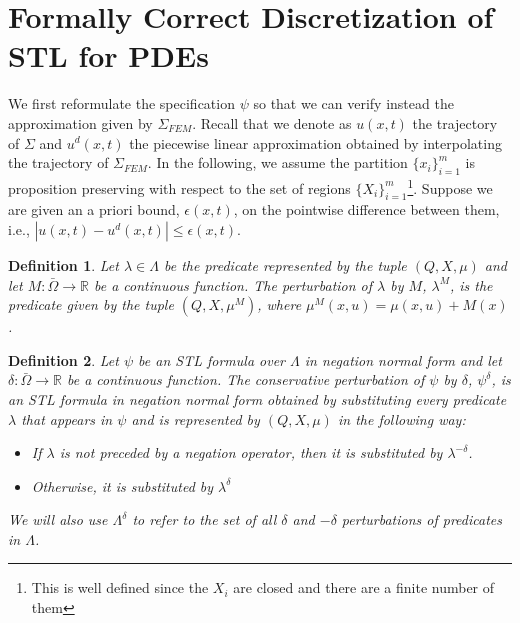 \documentclass{article}
\newtheorem{definition}{Definition}
\newcommand*{\R}{\mathbb{R}}
\begin{document}
\section{Formally Correct Discretization of STL for PDEs}
\label{sec:formally_correct_discretization_of_pdestl}

We first reformulate the specification $\psi$ so that we can verify instead the
approximation given by $\Sigma_{FEM}$. Recall that we denote as $u(x,t)$ the
trajectory of $\Sigma$ and $u^d(x, t)$ the piecewise linear approximation
obtained by interpolating the trajectory of $\Sigma_{FEM}$. In the following, we
assume the partition $\{x_i\}_{i=1}^m$ is proposition preserving with respect 
to the set of
regions $\{X_i\}_{i = 1}^{m}$\footnote{This is well defined since the $X_i$ are
closed and there are a finite number of them}. Suppose we are given
an a priori bound, $\epsilon(x, t)$, on the pointwise difference between them, i.e., 
$|u(x, t) - u^d(x, t)| \leq \epsilon(x, t)$.

\begin{definition}
\label{def:m_perturbation}
    Let $\lambda \in \Lambda$ be the predicate represented by the tuple $(Q, X,
    \mu)$ and let $M : \bar\Omega \to \R$ be a continuous function. The perturbation of
    $\lambda$ by $M$, $\lambda^M$, is the predicate given by the tuple $(Q, X,
    \mu^M)$, where $\mu^M(x, u) = \mu(x, u) + M(x)$.
\end{definition}

\begin{definition}
\label{def:delta_perturbation}
    Let $\psi$ be an STL formula over $\Lambda$ in negation normal form 
    and let $\delta : \bar\Omega \to \R$ be a continuous function. The
    conservative perturbation of $\psi$ by $\delta$, $\psi^\delta$, is an STL
    formula in negation normal form obtained by substituting every predicate
    $\lambda$ that appears in $\psi$ and is represented by $(Q, X, \mu)$ in the
    following way:

    \begin{itemize}
        \item If $\lambda$ is not preceded by a negation operator, then it is
            substituted by $\lambda^{-\delta}$.
        \item Otherwise, it is substituted by $\lambda^{\delta}$
    \end{itemize}

    We will also use $\Lambda^{\delta}$ to refer to the set of all $\delta$ and
    $-\delta$
    perturbations of predicates in $\Lambda$.
\end{definition}
\end{document}
